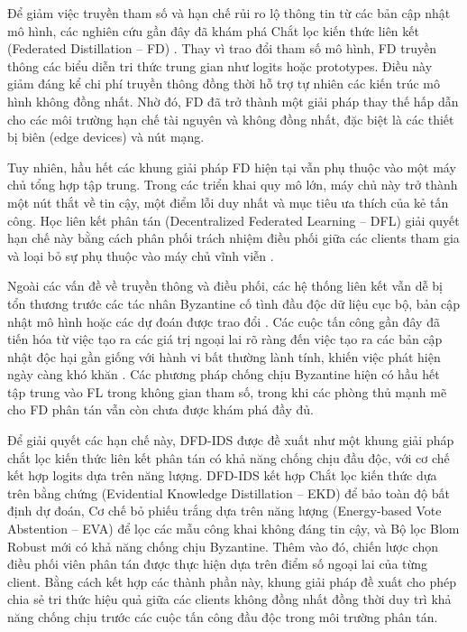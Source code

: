 Để giảm việc truyền tham số và hạn chế rủi ro lộ thông tin từ các bản cập nhật mô hình, các nghiên cứu gần đây đã khám phá Chắt lọc kiến thức liên kết (Federated Distillation -- FD) \cite{li2024fdsurvey}. Thay vì trao đổi tham số mô hình, FD truyền thông các biểu diễn tri thức trung gian như logits hoặc prototypes. Điều này giảm đáng kể chi phí truyền thông đồng thời hỗ trợ tự nhiên các kiến trúc mô hình không đồng nhất. Nhờ đó, FD đã trở thành một giải pháp thay thế hấp dẫn cho các môi trường hạn chế tài nguyên và không đồng nhất, đặc biệt là các thiết bị biên (edge devices) và nút mạng.

Tuy nhiên, hầu hết các khung giải pháp FD hiện tại vẫn phụ thuộc vào một máy chủ tổng hợp tập trung. Trong các triển khai quy mô lớn, máy chủ này trở thành một nút thắt về tin cậy, một điểm lỗi duy nhất và mục tiêu ưa thích của kẻ tấn công. Học liên kết phân tán (Decentralized Federated Learning -- DFL) giải quyết hạn chế này bằng cách phân phối trách nhiệm điều phối giữa các clients tham gia và loại bỏ sự phụ thuộc vào máy chủ vĩnh viễn \cite{braintorrent}.

Ngoài các vấn đề về truyền thông và điều phối, các hệ thống liên kết vẫn dễ bị tổn thương trước các tác nhân Byzantine cố tình đầu độc dữ liệu cục bộ, bản cập nhật mô hình hoặc các dự đoán được trao đổi \cite{tolpegin2020targetedflip, fang2020attacks, roux2025byzantine}. Các cuộc tấn công gần đây đã tiến hóa từ việc tạo ra các giá trị ngoại lai rõ ràng đến việc tạo ra các bản cập nhật độc hại gần giống với hành vi bất thường lành tính, khiến việc phát hiện ngày càng khó khăn \cite{roux2025byzantine}. Các phương pháp chống chịu Byzantine hiện có hầu hết tập trung vào FL trong không gian tham số, trong khi các phòng thủ mạnh mẽ cho FD phân tán vẫn còn chưa được khám phá đầy đủ.

Để giải quyết các hạn chế này, DFD-IDS được đề xuất như một khung giải pháp chắt lọc kiến thức liên kết phân tán có khả năng chống chịu đầu độc, với cơ chế kết hợp logits dựa trên năng lượng. DFD-IDS kết hợp Chắt lọc kiến thức dựa trên bằng chứng (Evidential Knowledge Distillation -- EKD) để bảo toàn độ bất định dự đoán, Cơ chế bỏ phiếu trắng dựa trên năng lượng (Energy-based Vote Abstention -- EVA) để lọc các mẫu công khai không đáng tin cậy, và Bộ lọc Blom Robust mới có khả năng chống chịu Byzantine. Thêm vào đó, chiến lược chọn điều phối viên phân tán được thực hiện dựa trên điểm số ngoại lai của từng client. Bằng cách kết hợp các thành phần này, khung giải pháp đề xuất cho phép chia sẻ tri thức hiệu quả giữa các clients không đồng nhất đồng thời duy trì khả năng chống chịu trước các cuộc tấn công đầu độc trong môi trường phân tán.

